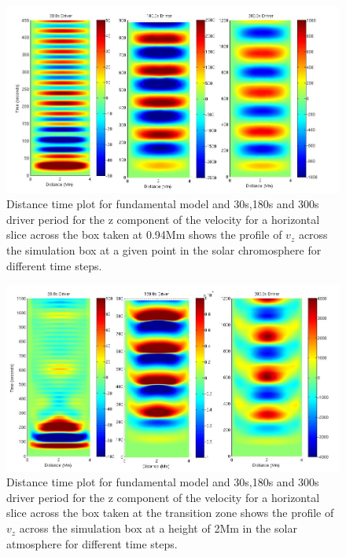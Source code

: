 \documentclass[final,1p]{elsarticle}
\begin{document}
\begin{figure}[h]\label{fig7_dt_30_180_300_0_horiz_p94Mm}
\includegraphics[scale=0.4]{images/fig5_dt_30_180_300_0_horiz_p94Mm.jpg}
\caption{Distance time plot for fundamental model and 30s,180s and 300s driver period for the z component of the velocity for a horizontal slice across the box  taken at 0.94Mm shows  the profile of $ v_{z}$ across the simulation box at a given point in the solar chromosphere for different time steps. }
\end{figure}


\begin{figure}[h]\label{fig8_dt_30_180_300_0_horiz_2Mm}
\includegraphics[scale=0.4]{images/fig6_dt_30_180_300_0_horiz_2Mm.jpg}
\caption{Distance time plot for fundamental model and 30s,180s and 300s driver period for the z component of the velocity for a horizontal slice across the box  taken at the transition zone shows  the profile of $v_{z}$ across the simulation box at a height of 2Mm in the solar atmosphere for different time steps. }
\end{figure}
\end{document}
